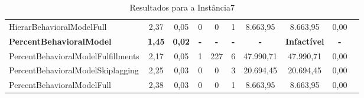 \begin{table}[H]
{\begin{tabular}{lccccccccc}
            HierarBehavioralModelFull & 2,37 & 0,05 & 0 & 0 & 1 & 8.663,95 & 8.663,95 & 0,00 \\
            \textbf{PercentBehavioralModel} & \textbf{1,45} & \textbf{0,02} & \textbf{-} & \textbf{-} & \textbf{-} & \textbf{- }& \textbf{Infactível} & \textbf{- }\\
            PercentBehavioralModelFulfillments & 2,17 & 0,05 & 1 & 227 & 6 & 47.990,71 & 47.990,71 & 0,00 \\
            PercentBehavioralModelSkiplagging & 2,25 & 0,03 & 0 & 0 & 3 & 20.694,45 & 20.694,45 & 0,00 \\
            PercentBehavioralModelFull & 2,38 & 0,03 & 0 & 0 & 1 & 8.663,95 & 8.663,95 & 0,00 \\ \hline
        \end{tabular}%
    }
    \caption{Resultados para a Instância7}
    \label{tab:resultado_instancia7}
\end{table}


